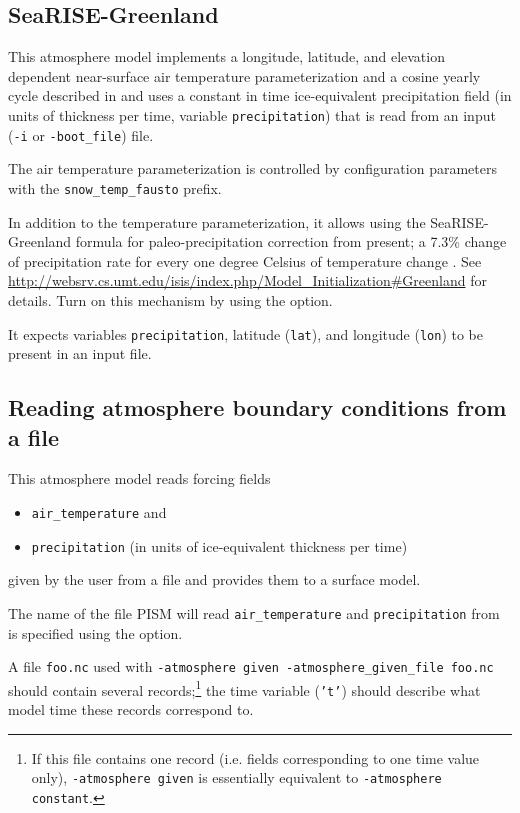 \documentclass[titlepage,letterpaper,final]{scrartcl}
\begin{document}
\subsection{SeaRISE-Greenland}
\label{sec:atmosphere-searise-greenland}

This atmosphere model implements a longitude, latitude, and elevation dependent near-surface air temperature parameterization and a cosine yearly cycle described in \cite{Faustoetal2009} and uses a constant in time ice-equivalent precipitation field (in units of thickness per time, variable \texttt{precipitation}) that is read from an input (\texttt{-i} or \texttt{-boot_file}) file.

The air temperature parameterization is controlled by configuration parameters with the \texttt{snow_temp_fausto} prefix.

In addition to the temperature parameterization, it allows using the SeaRISE-Greenland formula for paleo-precipitation correction from present; a 7.3\% change of precipitation rate for every one degree Celsius of temperature change \cite{Huybrechts02}.  See \url{http://websrv.cs.umt.edu/isis/index.php/Model_Initialization#Greenland} for details.  Turn on this mechanism by using the  option.

It expects variables \texttt{precipitation}, latitude (\texttt{lat}), and longitude (\texttt{lon}) to be present in an input file.

\subsection{Reading atmosphere boundary conditions from a file}
\label{sec:atmosphere-given}

This atmosphere model reads forcing fields
\begin{itemize}
\item \texttt{air_temperature} and
\item \texttt{precipitation} (in units of ice-equivalent thickness per time)
\end{itemize}
given by the user from a file and provides them to a surface model.

The name of the file PISM will read \texttt{air_temperature} and \texttt{precipitation} from is specified using the  option.

A file \texttt{foo.nc} used with \texttt{-atmosphere given -atmosphere_given_file foo.nc} should contain several records;\footnote{If this file contains one record (i.e. fields corresponding to one time value only), \texttt{-atmosphere given} is essentially equivalent to \texttt{-atmosphere constant}.} the time variable (\texttt{'t'}) should describe what model time these records correspond to.
\end{document}
